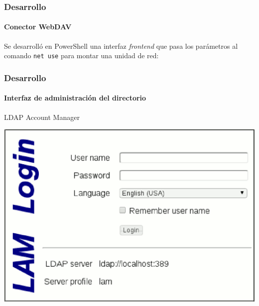 \documentclass{beamer}
\begin{document}

\begin{frame}
\frametitle{Desarrollo}
\framesubtitle{Conector WebDAV}

Se desarroll\'{o} en PowerShell una interfaz \textsl{frontend} que pasa los par\'{a}metros al comando \texttt{net use} para montar una unidad de red:

\vspace{2em}

\centering
 {
  
 }

\end{frame}


\begin{frame}
\frametitle{Desarrollo}
\framesubtitle{Interfaz de administraci\'{o}n del directorio}

LDAP Account Manager

\vspace{1em}

\centering
\includegraphics[scale=0.4,keepaspectratio=true]{figures/LAM}

\end{frame}

\end{document}
